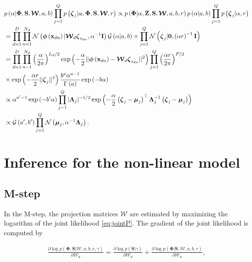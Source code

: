 \documentclass[]{article}
\newcommand{\gD}[2]{\mathcal{N}\left(#1,#2\right)}
\newcommand{\catD}[2]{\mathcal{G}\left(#1,#2\right)}
\newcommand{\Z}{\boldsymbol{\mathrm{Z}}}
\newcommand{\C}{\boldsymbol{\Lambda}_j}
\newcommand{\muJ}{\boldsymbol{\mu}_j}
\newcommand{\gammaA}{\Gamma\left(a\right)}
\newcommand{\eye}{\mathbf{I}}
\newcommand{\W}{\boldsymbol{\mathcal{W}}}
\newcommand{\indobj}{\mathbf{x}_{dn}}
\newcommand{\projMat}{\boldsymbol{\mathcal{W}}_d}
\newcommand{\lvec}{\boldsymbol{\zeta}_j}
\newcommand{\lvecs}{\boldsymbol{\zeta}_{s_{dn}}}
\newcommand{\phixnd}{\boldsymbol{\phi}\left(\indobj\right)}
\begin{document}
\begin{align}
&p\left(\alpha|\boldsymbol{\Phi},\mathbf{S},\W,a,b\right)\prod_{j=1}^{Q}p\left(\lvec|\alpha,\boldsymbol{\Phi},\mathbf{S},\W,r\right) \propto  p\left(\boldsymbol{\Phi}|\alpha,\Z,\mathbf{S},\W,a,b,r\right)p\left(\alpha|a,b\right)\prod_{j=1}^{Q}p\left(\lvec|\alpha,r\right) \notag\\
& =  \prod_{d=1}^{D}\prod_{n=1}^{N_d}{\gD{\phixnd|\projMat \lvecs}{\alpha^{-1}\eye}\catD{\alpha|a}{b}} \times \prod_{j=1}^{Q}\gD{\lvec|\mathbf{0}}{\left(\alpha r\right)^{-1}\eye} \notag \\
& = \prod_{d=1}^{D}\prod_{n=1}^{N_d}\left(\frac{\alpha}{2\pi}\right)^{L_d /2}\exp\left(-\frac{\alpha}{2}||\phixnd-\projMat\lvecs||^2\right) \prod_{j=1}^{Q}\left(\frac{\alpha r}{2\pi}\right)^{P/2} \notag \\
&\times \exp\left(-\frac{\alpha r}{2}||\lvec||^2\right)\frac{b^a \alpha^{a-1}}{\gammaA}\exp\left(-b\alpha\right) \notag \\
&\propto \alpha^{a'-1}\exp\left(-b'\alpha\right)\prod_{j=1}^{Q}|\C|^{-1/2}\exp\left(-\frac{\alpha}{2}\left(\lvec-\muJ\right)^{\top}\C^{-1}\left(\lvec-\muJ\right)\right) \notag \\
&\propto \catD{a'}{b'}\prod_{j=1}^{Q}\gD{\muJ}{\alpha^{-1}\C}.
\end{align}


\section{Inference for the non-linear model}

\subsection{M-step}

In the M-step, the projection matrices $\W$ are estimated by maximizing the logarithm of the joint likelihood \eqref{eq:jointP}. The gradient of the joint likelihood is computed by

\begin{align}
\frac{\partial \log p\left(\boldsymbol{\Phi},\mathbf{S}|\W,a,b,r,\gamma\right)}{\partial\projMat} =
\frac{\partial \log p\left(\mathbf{S}|\gamma\right)}{\partial\projMat} + \frac{\partial \log p\left(\boldsymbol{\Phi}|\mathbf{S},\boldsymbol{\mathcal{W}},a,b,r\right)}{\partial\projMat},
\end{align}
\end{document}
